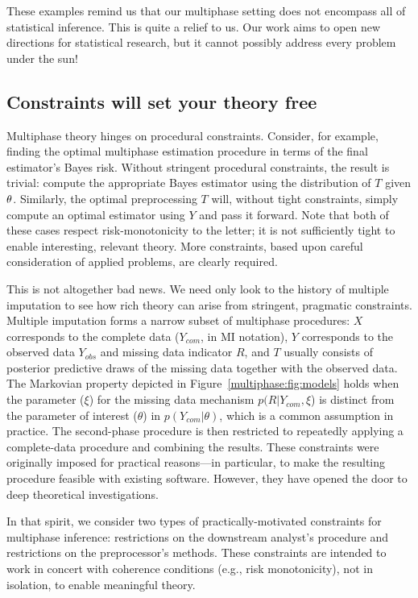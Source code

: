 These examples remind us that our multiphase setting does not encompass all of statistical inference.
This is quite a relief to us.
Our work aims to open new directions for statistical research, but it cannot possibly address every problem under the sun!

\subsection{Constraints will set your theory free}
\label{multiphase:sec:constraints}

Multiphase theory hinges on procedural constraints.
Consider, for example, finding the optimal multiphase estimation procedure in terms of the final estimator's Bayes risk.
Without stringent procedural constraints, the result is trivial: compute the appropriate Bayes estimator using the distribution of $T$ given $\theta$.
Similarly, the optimal preprocessing $T$ will, without tight constraints, simply compute an optimal estimator using $Y$ and pass it forward.
Note that both of these cases respect risk-monotonicity to the letter; it is not sufficiently tight to enable interesting, relevant theory.
More constraints, based upon careful consideration of applied problems, are clearly required.

This is not altogether bad news.
We need only look to the history of multiple imputation to see how rich theory can arise from stringent, pragmatic constraints.
Multiple imputation forms a narrow subset of multiphase procedures: $X$ corresponds to the complete data ($Y_{com}$, in MI notation), $Y$ corresponds to the observed data $Y_{obs}$ and missing data indicator $R$, and $T$ usually consists of posterior predictive draws of the missing data together with the observed data.
The Markovian property depicted in Figure~\ref{multiphase:fig:models} holds when the parameter ($\xi$) for the missing data mechanism $p(R|Y_{com},\xi$) is distinct from the parameter of interest ($\theta$) in $p(Y_{com}|\theta)$, which is a common assumption in practice.
The second-phase procedure is then restricted to repeatedly applying a complete-data procedure and combining the results.
These constraints were originally imposed for practical reasons---in particular, to make the resulting procedure feasible with existing software.
However, they have opened the door to deep theoretical investigations.

In that spirit, we consider two types of practically-motivated constraints for multiphase inference: restrictions on the downstream analyst's procedure and restrictions on the preprocessor's methods.
These constraints are intended to work in concert with coherence conditions (e.g., risk monotonicity), not in isolation, to enable meaningful theory.

